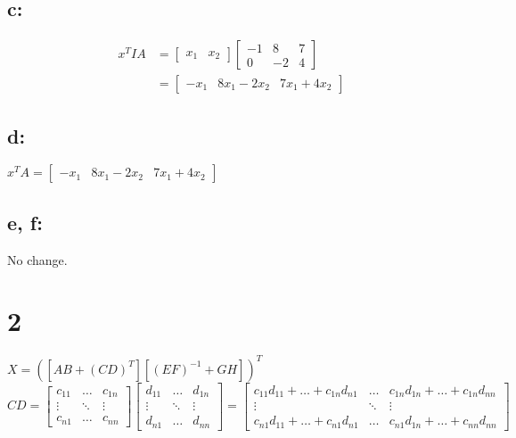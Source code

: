 \documentclass[11pt]{article}
\begin{document}
\subsection*{c:}
\begin{align*}
    x^{T}IA &=
    \begin{bmatrix}
        x_{1} & x_{2}
    \end{bmatrix}
    \begin{bmatrix}
        -1 & 8 & 7 \\
        0 & -2 & 4
    \end{bmatrix}\\
    &= \begin{bmatrix}
              -x_{1} & 8x_{1} - 2x_{2} & 7x_{1} + 4x_{2}
          \end{bmatrix}
\end{align*}

\subsection*{d:}$
    x^{T}A =
    \begin{bmatrix}
        -x_{1} & 8x_{1} - 2x_{2} & 7x_{1} + 4x_{2}
    \end{bmatrix}
$

\subsection*{e, f:} No change.

\section*{2}
$X = ([AB + (CD)^{T}][(EF)^{-1} + GH])^{T}$\\
$CD = \begin{bmatrix}
                 c_{11} & \ldots & c_{1n} \\
                 \vdots & \ddots  & \vdots\\
                 c_{n1} & \ldots & c_{nn}
             \end{bmatrix}
             \begin{bmatrix}
                 d_{11} & \ldots & d_{1n} \\
                 \vdots & \ddots  & \vdots\\
                 d_{n1} & \ldots & d_{nn}
             \end{bmatrix}
             =\begin{bmatrix}
                 c_{11}d_{11} + \ldots + c_{1n}d_{n1} & \ldots & c_{1n}d_{1n} + \ldots + c_{1n}d_{nn}\\
                 \vdots & \ddots  & \vdots\\
                 c_{n1}d_{11} + \ldots + c_{n1}d_{n1} & \ldots & c_{n1}d_{1n} + \ldots + c_{nn}d_{nn}
             \end{bmatrix}$
             
\end{document}
